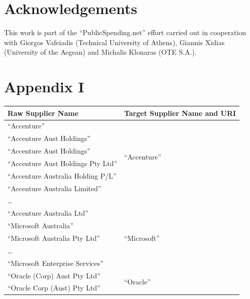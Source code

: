 \documentclass[1p,12pt]{elsarticle}
\begin{document}
\section{Acknowledgements}
This work is part of the ``PublicSpending.net'' effort carried out in cooperation with Giorgos Vafeiadis (Technical University of Athens), Giannis Xidias (University of the Aegean) and Michalis Klonaras (OTE S.A.).





%

\pagebreak
\section*{Appendix I}
\tiny
\begin{table}[!htb]
\renewcommand{\arraystretch}{1}
\begin{center}
\begin{tabular}{|p{8cm}|p{7.5cm}|}
\hline
  \textbf{Raw Supplier Name} & \textbf{Target Supplier Name and URI}  \\  \hline
  ``Accenture'' & \multirow{6}{*}{``Accenture''} \\
  ``Accenture Aust Holdings'' & \multirow{6}{*}{\scriptsize\url{http://live.dbpedia.org/resource/Accenture}} \\ 
   ``Accenture Aust Holdings'' & \\  
   ``Accenture Aust Holdings Pty Ltd'' & \\
   ``Accenture  Australia Holding P/L'' & \\
  ``Accenture Australia Limited'' & \\
  \ldots  & \\
  ``Accenture Australia Ltd'' & \\ \hline
  ``Microsoft Australia'' & \multirow{3}{*}{``Microsoft''} \\
  ``Microsoft Australia Pty Ltd'' & \multirow{3}{*}{\scriptsize\url{http://live.dbpedia.org/resource/Microsoft}} \\
  \ldots  & \\
  ``Microsoft Enterprise Services'' & \\ \hline
  ``Oracle (Corp) Aust Pty Ltd''  & \multirow{9}{*}{``Oracle''} \\
  ``Oracle Corp (Aust) Pty Ltd''  & \multirow{9}{*}{\scriptsize\url{http://live.dbpedia.org/resource/Oracle_Corporation}} \\

\end{tabular}
\end{center}
\end{table}
\end{document}
